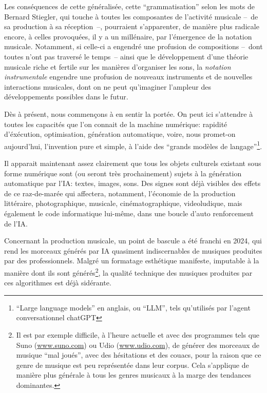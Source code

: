 \indent Les conséquences de cette  généralisée, cette ``grammatisation'' selon les mots de Bernard Stiegler, qui touche à toutes les composantes de l'activité musicale --~de sa production à sa réception~--, pourraient s'apparenter, de manière plus radicale encore, à celles provoquées, il y a un millénaire, par l'émergence de la notation musicale. Notamment, si celle-ci a engendré une profusion de compositions --~dont toutes n'ont pas traversé le temps~-- ainsi que le développement d'une théorie musicale riche et fertile sur les manières d'organiser les sons, la \textit{notation instrumentale} engendre une profusion de nouveaux instruments et de nouvelles interactions musicales, dont on ne peut qu'imaginer l'ampleur des développements possibles dans le futur.


\indent Dès à présent, nous commençons à en sentir la portée. On peut ici s'attendre à toutes les capacités que l'on connait de la machine numérique: rapidité d'éxécution, optimisation, génération automatique, voire, nous promet-on aujourd'hui, l'invention pure et simple, à l'aide des ``grands modèles de langage''\footnote{``Large language models'' en anglais, ou ``LLM'', tels qu'utilisés par l'agent conversationnel chatGPT}. 

Il apparait maintenant assez clairement que tous les objets culturels existant sous forme numérique sont (ou seront très prochainement) sujets à la génération automatique par l'IA: textes, images, sons. Des signes sont déjà visibles des effets de ce raz-de-marée qui affectera, notamment, l'économie de la production littéraire, photographique, musicale, cinématographique, videoludique, mais également le code informatique lui-même, dans une boucle d'auto renforcement de l'IA.

Concernant la production musicale, un point de bascule a été franchi en 2024, qui rend les morceaux générés par IA quasiment indiscernables de musiques produites par des professionnels. Malgré un formatage esthétique manifeste, imputable à la manière dont ils sont générés\footnote{Il est par exemple difficile, à l'heure actuelle et avec des programmes tels que Suno (\url{www.suno.com}) ou Udio (\url{www.udio.com}), de générer des morceaux de musique ``mal joués'', avec des hésitations et des couacs, pour la raison que ce genre de musique est peu représentée dans leur corpus. Cela s'applique de manière plus générale à tous les genres musicaux à la marge des tendances dominantes.}, la qualité technique des musiques produites par ces algorithmes est déjà sidérante.

